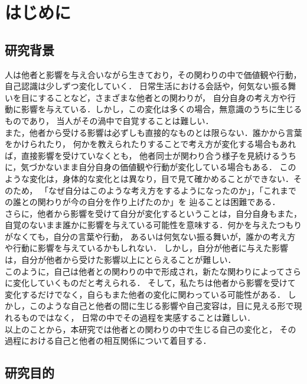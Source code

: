 
\chapter{はじめに}
\label{chp:first}

\section{研究背景}
\label{sec:paragraph}

人は他者と影響を与え合いながら生きており，その関わりの中で価値観や行動，自己認識は少しずつ変化していく．
日常生活における会話や，何気ない振る舞いを目にすることなど，さまざまな他者との関わりが，
自分自身の考え方や行動に影響を与えている．しかし，この変化は多くの場合，無意識のうちに生じるものであり，
当人がその渦中で自覚することは難しい．\\
また，他者から受ける影響は必ずしも直接的なものとは限らない．誰かから言葉をかけられたり，
何かを教えられたりすることで考え方が変化する場合もあれば，直接影響を受けていなくとも，
他者同士が関わり合う様子を見続けるうちに，気づかないまま自分自身の価値観や行動が変化している場合もある．
このような変化は，身体的な変化とは異なり，目で見て確かめることができない．そのため，
「なぜ自分はこのような考え方をするようになったのか」，「これまでの誰との関わりが今の自分を作り上げたのか」を
辿ることは困難である．\\
さらに，他者から影響を受けて自分が変化するということは，自分自身もまた，
自覚のないまま誰かに影響を与えている可能性を意味する．何かを与えたつもりがなくても，自分の言葉や行動，
あるいは何気ない振る舞いが，誰かの考え方や行動に影響を与えているかもしれない．
しかし，自分が他者に与えた影響は，自分が他者から受けた影響以上にとらえることが難しい．\\
このように，自己は他者との関わりの中で形成され，新たな関わりによってさらに変化していくものだと考えられる．
そして，私たちは他者から影響を受けて変化するだけでなく，自らもまた他者の変化に関わっている可能性がある．
しかし，このような自己と他者の間に生じる影響や自己変容は，目に見える形で現れるものではなく，
日常の中でその過程を実感することは難しい．\\
以上のことから，本研究では他者との関わりの中で生じる自己の変化と，
その過程における自己と他者の相互関係について着目する．


\section{研究目的}
\label{sec:enum}

